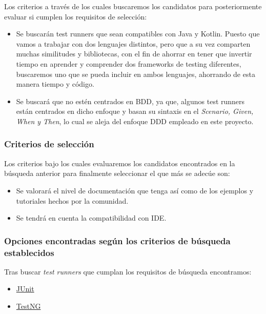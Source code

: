 Los criterios a través de los cuales buscaremos los candidatos para
posteriormente evaluar si cumplen los requisitos de selección:
\begin{itemize}
    \item Se buscarán test runners que sean compatibles con Java y Kotlin.
    Puesto que vamos a trabajar con dos lenguajes distintos, pero que a su vez
    comparten muchas similitudes y bibliotecas, con el fin de ahorrar en tener
    que invertir tiempo en aprender y comprender dos frameworks de testing
    diferentes, buscaremos uno que se pueda incluir en ambos lenguajes,
    ahorrando de esta manera tiempo y código. 
    \item Se buscará que no estén centrados en BDD, ya que, algunos test runners
    están centrados en dicho enfoque y basan su sintaxis en el \emph{Scenario,
    Given, When y Then}, lo cual se aleja del enfoque DDD empleado en este proyecto.
\end{itemize}

\subsubsection{Criterios de selección}

Los criterios bajo los cuales evaluaremos los candidatos encontrados en la
búsqueda anterior para finalmente seleccionar el que más se adecúe son:
\begin{itemize}
    \item Se valorará el nivel de documentación que tenga así como de los
    ejemplos y tutoriales hechos por la comunidad.
    \item Se tendrá en cuenta la compatibilidad con IDE.
\end{itemize}


\subsubsection{Opciones encontradas según los criterios de búsqueda establecidos}

Tras buscar \emph{test runners} que cumplan los requisitos de búsqueda encontramos:

\begin{itemize}
    \item \href{https://junit.org/junit5/}{JUnit}
    \item \href{https://testng.org/doc/index.html}{TestNG}
\end{itemize}

